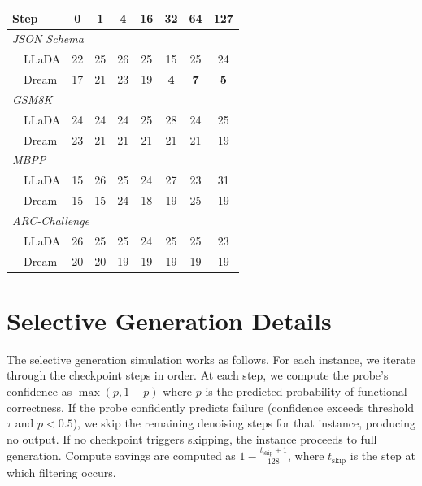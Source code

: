 \documentclass[11pt]{article}
\providecommand{\linenumbers}{}
\providecommand{\nolinenumbers}{}
\begin{document}
\nolinenumbers
\begin{center}
  \small
  \label{tab:best_layer}
  \begin{tabular}{l*{7}{c}}
    \toprule
    \textbf{Step} & 0 & 1 & 4 & 16 & 32 & 64 & 127 \\
    \midrule
    \multicolumn{8}{l}{\textit{JSON Schema}} \\
    ~~LLaDA & 22 & 25 & 26 & 25 & 15 & 25 & 24 \\
    ~~Dream & 17 & 21 & 23 & 19 & \textbf{4} & \textbf{7} & \textbf{5} \\
    \midrule
    \multicolumn{8}{l}{\textit{GSM8K}} \\
    ~~LLaDA & 24 & 24 & 24 & 25 & 28 & 24 & 25 \\
    ~~Dream & 23 & 21 & 21 & 21 & 21 & 21 & 19 \\
    \midrule
    \multicolumn{8}{l}{\textit{MBPP}} \\
    ~~LLaDA & 15 & 26 & 25 & 24 & 27 & 23 & 31 \\
    ~~Dream & 15 & 15 & 24 & 18 & 19 & 25 & 19 \\
    \midrule
    \multicolumn{8}{l}{\textit{ARC-Challenge}} \\
    ~~LLaDA & 26 & 25 & 25 & 24 & 25 & 25 & 23 \\
    ~~Dream & 20 & 20 & 19 & 19 & 19 & 19 & 19 \\
    \bottomrule
  \end{tabular}
\end{center}
\linenumbers

\section{Selective Generation Details}
\label{sec:appendix_early_exit}

The selective generation simulation works as follows.
For each instance, we iterate through the checkpoint steps in order.
At each step, we compute the probe's confidence as $\max(p, 1-p)$ where $p$ is the predicted probability of functional correctness.
If the probe confidently predicts failure (confidence exceeds threshold $\tau$ and $p < 0.5$), we skip the remaining denoising steps for that instance, producing no output.
If no checkpoint triggers skipping, the instance proceeds to full generation.
Compute savings are computed as $1 - \frac{t_{\text{skip}} + 1}{128}$, where $t_{\text{skip}}$ is the step at which filtering occurs.
\end{document}
